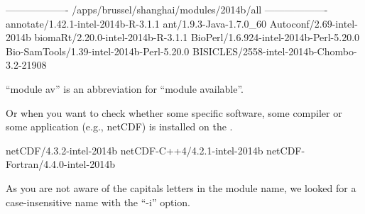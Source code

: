\begin{prompt}
------------------- /apps/brussel/shanghai/modules/2014b/all -------------------
annotate/1.42.1-intel-2014b-R-3.1.1
ant/1.9.3-Java-1.7.0_60
Autoconf/2.69-intel-2014b
biomaRt/2.20.0-intel-2014b-R-3.1.1
BioPerl/1.6.924-intel-2014b-Perl-5.20.0
Bio-SamTools/1.39-intel-2014b-Perl-5.20.0
BISICLES/2558-intel-2014b-Chombo-3.2-21908
\end{prompt}

``module av'' is an abbreviation for ``module available''.

Or when you want to check whether some specific software, some compiler or some
application (e.g., netCDF) is installed on the \hpc.

\begin{prompt}
netCDF/4.3.2-intel-2014b
netCDF-C++4/4.2.1-intel-2014b
netCDF-Fortran/4.4.0-intel-2014b
\end{prompt}

As you are not aware of the capitals letters in the module name, we looked for
a case-insensitive name with the ``-i'' option.
